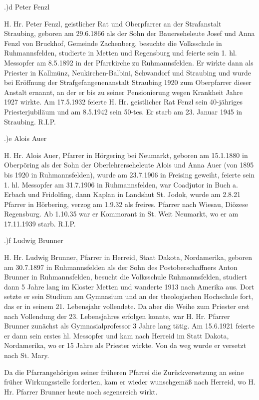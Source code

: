 .)d Peter Fenzl

H. Hr. Peter Fenzl, geistlicher Rat und Oberpfarrer an der Strafanstalt
Straubing, geboren am 29.6.1866 als der Sohn der Bauerseheleute Josef und Anna
Fenzl von Bruckhof, Gemeinde Zachenberg, besuchte die Volksschule in
Ruhmannsfelden, studierte in Metten und Regensburg und feierte sein 1. hl.
Messopfer am 8.5.1892 in der Pfarrkirche zu Ruhmannsfelden. Er wirkte dann als
Priester in Kallmünz, Neukirchen-Balbini, Schwandorf und Straubing und wurde bei
Eröffnung der Strafgefangenenanstalt Straubing 1920 zum Oberpfarrer dieser
Anstalt ernannt, an der er bis zu seiner Pensionierung wegen Krankheit Jahre
1927 wirkte. Am 17.5.1932 feierte H. Hr. geistlicher Rat Fenzl sein 40-jähriges
Priesterjubiläum und am 8.5.1942 sein 50-tes. Er starb am 23. Januar 1945 in
Straubing. R.I.P.

.)e Alois Auer

H. Hr. Alois Auer, Pfarrer in Hörgering bei Neumarkt, geboren am 15.1.1880 in
Oberpöring als der Sohn der Oberlehrerseheleute Alois und Anna Auer (von 1895
bis 1920 in Ruhmannsfelden), wurde am 23.7.1906 in Freising geweiht, feierte
sein 1. hl. Messopfer am 31.7.1906 in Ruhmannsfelden, war Coadjutor in Buch a.
Erbach und Fridolfing, dann Kaplan in Landshut St. Jodok, wurde am 2.8.21
Pfarrer in Hörbering, verzog am 1.9.32 als freires. Pfarrer nach Wiesau, Diözese
Regensburg. Ab 1.10.35 war er Kommorant in St. Weit Neumarkt, wo er am
17.11.1939 starb. R.I.P.

.)f Ludwig Brunner

H. Hr. Ludwig Brunner, Pfarrer in Herreid, Staat Dakota, Nordamerika, geboren am
30.7.1897 in Ruhmannsfelden als der Sohn des Postoberschaffners Anton Brunner in
Ruhmannsfelden, besucht die Volksschule Ruhmannsfelden, studiert dann 5 Jahre
lang im Kloster Metten und wanderte 1913 nach Amerika aus. Dort setzte er sein
Studium am Gymnasium und an der theologischen Hochschule fort, das er in seinem
21. Lebensjahr vollendete. Da aber die Weihe zum Priester erst nach Vollendung
der 23. Lebensjahres erfolgen konnte, war H. Hr. Pfarrer Brunner zunächst als
Gymnasialprofessor 3 Jahre lang tätig. Am 15.6.1921 feierte er dann sein erstes
hl. Messopfer und kam nach Herreid im Statt Dakota, Nordamerika, wo er 15 Jahre
als Priester wirkte. Von da weg wurde er versetzt nach St. Mary.

Da die Pfarrangehörigen seiner früheren Pfarrei die Zurückversetzung an seine
früher Wirkungsstelle forderten, kam er wieder wunschgemäß nach Herreid, wo H.
Hr. Pfarrer Brunner heute noch segensreich wirkt.


